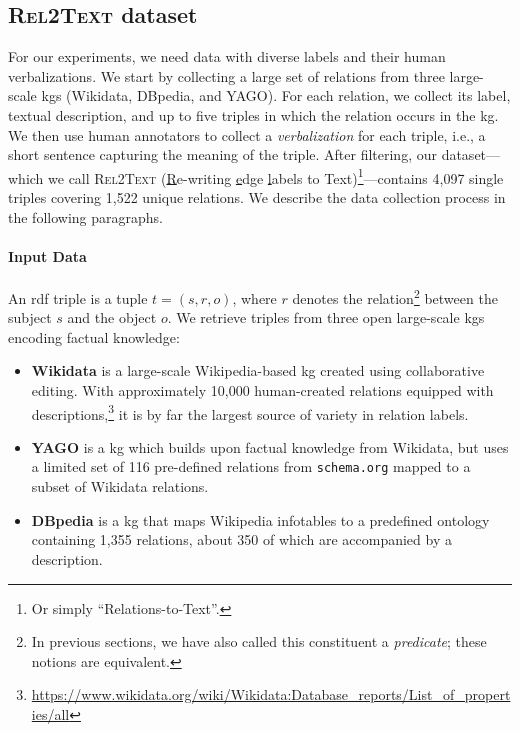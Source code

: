 

\subsection{\textsc{Rel2Text} dataset}
\label{sec:rel2text:data}
For our experiments, we need data with diverse labels and their human verbalizations. We start by collecting a large set of relations from three large-scale \acp{kg} (Wikidata, DBpedia, and YAGO). For each relation, we collect its label, textual description, and up to five triples in which the relation occurs in the \ac{kg}. We then use human annotators to collect a \emph{verbalization} for each triple, i.e., a short sentence capturing the meaning of the triple. After filtering, our dataset---which we call \textsc{Rel2Text} (\underline{R}e-writing \underline{e}dge \underline{l}abels to Text)\footnote{Or simply ``Relations-to-Text''.}---contains 4,097 single triples covering 1,522 unique relations. We describe the data collection process in the following paragraphs.


\paragraph{Input Data}
An \acs{rdf} triple is a tuple $t = (s, r, o)$, where $r$ denotes the relation\footnote{In previous sections, we have also called this constituent a \emph{predicate}; these notions are equivalent.} between the subject $s$ and the object $o$.
We retrieve triples from three open large-scale \acp{kg} encoding factual knowledge:

\begin{itemize}
    \item \textbf{Wikidata} \cite{vrandevcic2014wikidata} is a large-scale Wikipedia-based \ac{kg} created using collaborative editing. With approximately 10,000 human-created relations equipped with descriptions,\footnote{\url{https://www.wikidata.org/wiki/Wikidata:Database_reports/List_of_properties/all}} it is by far the largest source of variety in relation labels.
    \item \textbf{YAGO} \cite{pellissier2020yago} is a \ac{kg} which builds upon factual knowledge from Wikidata, but uses a limited set of 116 pre-defined relations from \texttt{schema.org} \cite{guha2016schema} mapped to a subset of Wikidata relations.
    \item \textbf{DBpedia} \cite{auer2007dbpedia,lehmann2015dbpedia} is a \ac{kg} that maps Wikipedia infotables to a predefined ontology containing 1,355 relations, about 350 of which are accompanied by a description.
\end{itemize}

